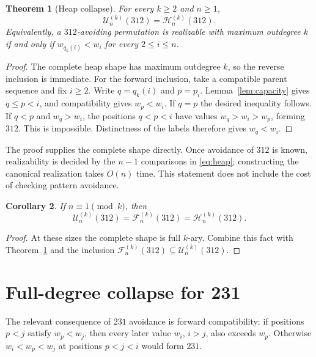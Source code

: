 \documentclass[11pt]{article}
\newtheorem{theorem}{Theorem}[section]
\newtheorem{corollary}[theorem]{Corollary}
\theoremstyle{definition}
\newcommand{\UB}{\mathcal U}
\newcommand{\FB}{\mathcal F}
\newcommand{\HP}{\mathcal H}
\begin{document}
\begin{theorem}[Heap collapse]\label{thm:A}
For every $k\ge2$ and $n\ge1$,
\[
\UB_n^{(k)}(312)=\HP_n^{(k)}(312).
\]
Equivalently, a $312$-avoiding permutation is realizable with maximum outdegree $k$ if and only if $w_{q_k(i)}<w_i$ for every $2\le i\le n$.
\end{theorem}
\begin{proof}
The complete heap shape has maximum outdegree $k$, so the reverse inclusion is immediate. For the forward inclusion, take a compatible parent sequence and fix $i\ge2$. Write $q=q_k(i)$ and $p=p_i$. Lemma~\ref{lem:capacity} gives $q\le p<i$, and compatibility gives $w_p<w_i$. If $q=p$ the desired inequality follows. If $q<p$ and $w_q>w_i$, the positions $q<p<i$ have values $w_q>w_i>w_p$, forming $312$. This is impossible. Distinctness of the labels therefore gives $w_q<w_i$.
\end{proof}

The proof supplies the complete shape directly. Once avoidance of $312$ is known, realizability is decided by the $n-1$ comparisons in \eqref{eq:heap}; constructing the canonical realization takes $O(n)$ time. This statement does not include the cost of checking pattern avoidance.

\begin{corollary}\label{cor:full312}
If $n\equiv1\pmod{k}$, then
\[
\UB_n^{(k)}(312)=\FB_n^{(k)}(312)=\HP_n^{(k)}(312).
\]
\end{corollary}
\begin{proof}
At these sizes the complete shape is full $k$-ary. Combine this fact with Theorem~\ref{thm:A} and the inclusion $\FB_n^{(k)}(312)\subseteq\UB_n^{(k)}(312)$.
\end{proof}

\section{Full-degree collapse for 231}\label{sec:B}

The relevant consequence of $231$ avoidance is forward compatibility: if positions $p<j$ satisfy $w_p<w_j$, then every later value $w_i$, $i>j$, also exceeds $w_p$. Otherwise $w_i<w_p<w_j$ at positions $p<j<i$ would form $231$.
\end{document}
